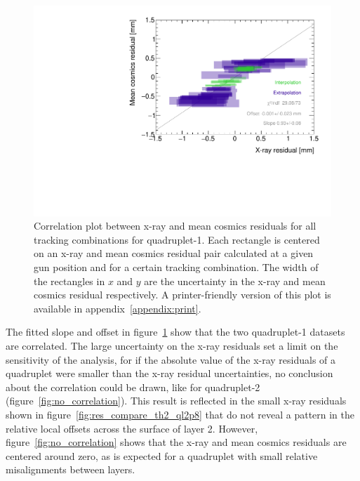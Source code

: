 \begin{figure}
    \centering
    \includegraphics[width = \textwidth]{figures/figure_QL2P11_3100V_2021-08-05_QL2P11_local_cosmic_and_xray_data_correlation_plot.pdf}
    \caption{Correlation plot between x-ray and mean cosmics residuals for all tracking combinations for quadruplet-1. Each rectangle is centered on an x-ray and mean cosmics residual pair calculated at a given gun position and for a certain tracking combination. The width of the rectangles in $x$ and $y$ are the uncertainty in the x-ray and mean cosmics residual respectively. A printer-friendly version of this plot is available in appendix~\ref{appendix:print}.}
    \label{fig:correlation}
\end{figure}

The fitted slope and offset in figure~\ref{fig:correlation} show that the two quadruplet-1 datasets are correlated. The large uncertainty on the x-ray residuals set a limit on the sensitivity of the analysis, for if the absolute value of the x-ray residuals of a quadruplet were smaller than the x-ray residual uncertainties, no conclusion about the correlation could be drawn, like for quadruplet-2 (figure~\ref{fig:no_correlation}). This result is reflected in the small x-ray residuals shown in figure~\ref{fig:res_compare_th2_ql2p8} that do not reveal a pattern in the relative local offsets across the surface of layer 2. However, figure~\ref{fig:no_correlation} shows that the x-ray and mean cosmics residuals are centered around zero, as is expected for a quadruplet with small relative misalignments between layers.

